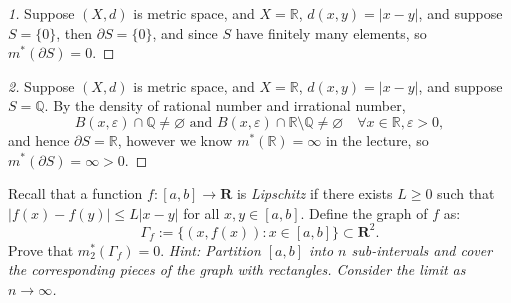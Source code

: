 \begin{proof}[1]
    Suppose $(X, d)$ is metric space, and $X = \mathbb{R}$, $d (x,y) = \lvert x-y \rvert$, and suppose $S = \{0\}$, then $\partial S = \{0\}$, and since $S$ have finitely many elements, so $m^*(\partial S) = 0$.
\end{proof}

\begin{proof}[2]
    Suppose $(X, d)$ is metric space, and $X = \mathbb{R}$, $d (x,y) = \lvert x-y \rvert$, and suppose $S = \mathbb{Q}$. By the density of rational number and irrational number,
    \[
        B(x,\varepsilon) \cap \mathbb{Q} \neq \varnothing \text{ and } B(x,\varepsilon) \cap \mathbb{R} \setminus\mathbb{Q} \neq \varnothing \quad \forall x \in \mathbb{R}, \varepsilon > 0,
    \]
    and hence $\partial S = \mathbb{R}$, however we know $m^*(\mathbb{R}) = \infty$ in the lecture, so $m^*(\partial S) = \infty > 0$.
\end{proof}

\begin{problem}

Recall that a function $f: [a, b] \to \mathbf{R}$ is \textit{Lipschitz} if there exists $L \geq 0$ such that $|f(x) - f(y)| \leq L|x-y|$ for all $x, y \in [a, b]$. 
Define the graph of $f$ as:
\[
\Gamma_f := \{(x, f(x)) : x \in [a, b]\} \subset \mathbf{R}^2.
\]
Prove that $m^*_2(\Gamma_f) = 0$. 
\textit{Hint: Partition $[a, b]$ into $n$ sub-intervals and cover the corresponding pieces of the graph with rectangles. Consider the limit as $n \to \infty$.}

\end{problem}

